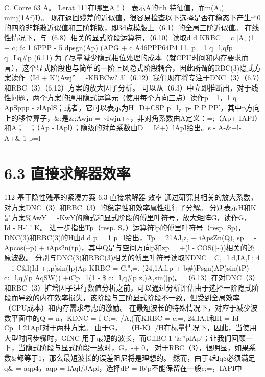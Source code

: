 \documentclass[UTF8,11pt,a4paper,openany,fontset=fandol]{ctexbook}
\begin{document}
C. Corre 63 A。 Lerat 111在哪里A！） 表示A的ith 特征值，而m(A,) = minj(1Af)I）。 现在返回残差的近似值，很容易检查以下选择是否在稳态下产生r“0的四阶非耗散近似值和三阶耗散，即3d点模版上（6.1）的全局三阶近似值。 在线性情况下，与（6.8）相关的显式阶段运算符，（6.10）读取d d KRBC = c [A, (1 + c; 6: 1 6PPP - 5 dpsgn(Ap) (APG + c A46PPP64P4 11. p= 1 q=l,qfp q=Lq\#p (6.11) 为了尽量减少隐式相位处理的成本（就CPU时间和内存要求而言），这个显式阶段也与简单的一阶上风隐式阶段耦合，因此所谓的RBC(3)隐式方案读作（Id + K')Awj” = -KRBCw? 3'（6.12）我们现在将专注于DNC（3）（6.7）和RBC（3）（6.12）方案的放大因子分析。 可以从（6.3）中立即推断出，对于线性问题，两个方案的通用隐式运算元（使用每个方向三点）读作p= 1，1 q = ApSppp - zlAplS；或者，它可以表示为H=D+CSP p=l，p- P P PP'，其中p方向上的移位算子，\&;是\&;Awjn = \textasciitilde{}Iwjn+\textasciitilde{}，非对角系数由A定义：=;（Ap+ IAPI）和A；=；（Ap - lApl）；隐级的对角系数由D = Id+）lApI给出。s - A-\&+l- A+\&-1 p=l

\section{6.3 直接求解器效率}
112 基于隐性残基的紧凑方案 6.3 直接求解器 效率 通过研究其相关的放大系数，对方案DNC（3）和RBC（3）的稳定性和效率属性进行了分解。 分别表示H和K是方案\%AwY = -KwY的隐式和显式阶段的傅里叶符号，放大矩阵G，读作G，= Id - H-' ' K。 进一步指出Tp（resp. S，）运算符lp的傅里叶符号（resp. Sp)，DNC(3)和RBC(3)的H由d d p = 1 p=l给出，Tp = 21AJ,z, + iApsZn(Q), sp = -Apcos(\textasciitilde{}p) + iAps2n(tp)，其中Q是与空间方向p和zp = +(l - COS([\textasciitilde{}))相关的还原波数。 分别与DNC(3)和RBC(3)相关的傅里叶符号读取KDNC= C,=l d,IA,I.; 4 + i C\&l(Id +;.p)sin(lp)Ap KRBC = C,",=, (24,1A,l.p + b\#)Psgn(AP)sin(tP) c:=l,q\#p AqSW)) +iCp=1(1 - \$ c:=l,q\#p z,)A,sin([p)。 （6.13）在对DNC（3）和RBC（3）扩增因子进行数值分析之前，可以通过分析评估由于选择一阶隐式阶段而导致的内在效率损失，该阶段与三阶显式阶段不一致，但受到全局效率（CPU成本）和内存需求考虑的激励。 在最短波长的特殊情况下，对应于减少波数平面中的Q = n，KDNC = f C:=, /A,(而KRBC = c:=, 24,IA,I和H = Id + Cp=l 21ApI对于两种方案。 由于G，=（H-K）/H在标量情况下，因此，当使用大型时间步骤时，GfNC-用于最短的波长，而GflBC-1-'\&''plAp'；让我们回顾一下，当隐式阶段与显式阶段一致时，G，-+ 0。 对于RBC（3），很明显，如果系数\&都等于1，那么最短波长的误差阻尼将是理想的。 然而，由于4和q\$必须满足q\& = aqp4，aqp = lAql/JApl，选择dP = lb'p不能保留在一般c;=，IAPI中
\end{document}
